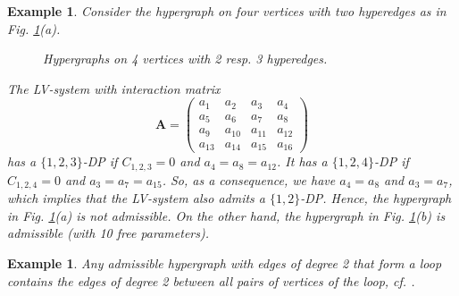 \documentclass{article}
\newcounter{NN}
\newtheorem{example}[NN]{Example}
\def\A{\mathbf{A}}
\begin{document}
\begin{example} \label{exam1}
Consider the hypergraph on four vertices with two hyperedges as in Fig. \ref{h423}(a).
\begin{figure}[H]
\centering
\begin{subfigure}{0.2\textwidth}
\end{subfigure}
\begin{subfigure}{0.2\textwidth}
\end{subfigure}
\caption{\label{h423} Hypergraphs on 4 vertices with 2 resp. 3 hyperedges.}
\end{figure}
The LV-system with interaction matrix
\[
\A=\begin{pmatrix}
a_{1} & a_{2} & a_{3} & a_{4} 
\\
 a_{5} & a_{6} & a_{7} & a_{8} 
\\
 a_{9} & a_{10} & a_{11} & a_{12} 
\\
 a_{13} & a_{14} & a_{15} & a_{16} 
\end{pmatrix}
\]
has a $\{1,2,3\}$-DP if $C_{1,2,3}=0$ and $a_4=a_8=a_{12}$. It has a $\{1,2,4\}$-DP if
$C_{1,2,4}=0$ and $a_3=a_7=a_{15}$. So, as a consequence, we have $a_4=a_8$ and $a_3=a_7$,
which implies that the LV-system also admits a $\{1,2\}$-DP. Hence, the hypergraph in Fig. \ref{h423}(a) is not admissible. On the other hand, the hypergraph in Fig. \ref{h423}(b) is admissible (with
10 free parameters).
\end{example}
\begin{example} \label{exam2} Any admissible hypergraph with edges of degree 2 that form a loop contains the edges of degree 2 between all pairs of vertices of the loop, cf. \cite[Proposition 4.1]{KMMQ}.
\end{example}
\end{document}
